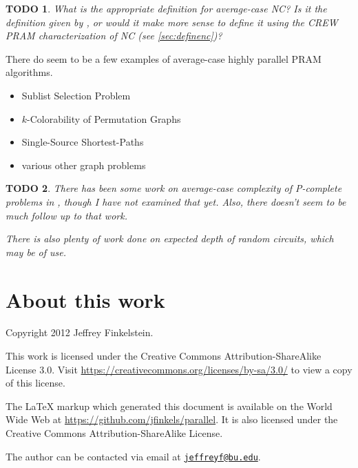 \documentclass{article}
\newcommand{\email}[1]{\href{mailto:#1}{\nolinkurl{#1}}}
\newtheorem{todo}{TODO}
\begin{document}
\begin{todo}
  What is the appropriate definition for average-case \textsl{\textsf{NC}}?
  Is it the definition given by \cite{bcgl89}, or would it make more sense to define it using the CREW PRAM characterization of \textsl{\textsf{NC}}{} (see \autoref{sec:definenc})?
\end{todo}

There do seem to be a few examples of average-case highly parallel PRAM algorithms.
\begin{itemize}
\item Sublist Selection Problem \cite{pz91}
\item $k$-Colorability of Permutation Graphs \cite{an99}
\item Single-Source Shortest-Paths \cite{meyer02}
\item various other graph problems \cite{rs92}
\end{itemize}

\begin{todo}
  There has been some work on average-case complexity of \textsl{\textsf{P}}-complete problems in \cite{sx99}, though I have not examined that yet.
  Also, there doesn't seem to be much follow up to that work.

  There is also plenty of work done on expected depth of random circuits, which may be of use.
\end{todo}

\section{About this work}

Copyright 2012 Jef{}frey Finkelstein.

This work is licensed under the Creative Commons Attribution-ShareAlike License 3.0.
Visit \mbox{\url{https://creativecommons.org/licenses/by-sa/3.0/}} to view a copy of this license.

The \LaTeX{} markup which generated this document is available on the World Wide Web at \mbox{\url{https://github.com/jfinkels/parallel}}.
It is also licensed under the Creative Commons Attribution-ShareAlike License.

The author can be contacted via email at \email{jeffreyf@bu.edu}.



\end{document}
